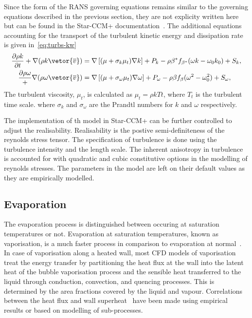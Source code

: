 Since the form of the RANS governing equations remains similar to the governing equations described in the
 previous section, they are not explicity written here but can be found in the Star-CCM+ documentation~.
 The additional equations accounting for the transport of the turbulent kinetic energy and dissipation rate 
 is given in~\ref{eq:turbs-kw}
 \begin{subequations}\label{eq:turbs-kw}
 \begin{align}
    \frac{\partial \rho k}{\partial t}  + \nabla (\rho k \vetor{\overline{v}}) &= \nabla \left[(\mu + \sigma_{k} \mu_{t})\nabla k\right] + P_k
        - \rho \beta^{*}f_{\beta^{*}} (\omega k - \omega_0 k_0) + S_k,\\
    \frac{\partial \rho \omega} + \nabla (\rho \omega \vetor{\overline{v}}) & = \nabla\left[(\mu + \sigma_{\omega}\mu_t) \nabla \omega\right] + P_{\omega}
        - \rho \beta f_{\beta}(\omega^{2} - \omega_{0}^{2}) + S_{\omega},
 \end{align} 
 \end{subequations}
 The turbulent viscosity, $\mu_t$, is calculated as $\mu_{t} = \rho k T{t}$, where $T_{t}$ is the turbulent time scale. 
 where $\sigma_{k}$ and $\sigma_{\omega}$ are the Prandtl numbers for $k$ and $\omega$ respectively. 


The implementation of th model in Star-CCM+ can be further controlled to
 adjust the realisability. Realisability is the postive semi-definiteness of the 
 reynolds stress tensor. The specification of turbulence is done using
 the turbulence intensity and the length scale. The inherent anisotropy 
 in turbulence is accounted for with quadratic and cubic constitutive options
 in the modelling of reynolds stresses. The parameters in the model
 are left on their default values as they are empirically modelled.

\subsection{Evaporation}
The evaporation process is distinguished between occuring at saturation temperatures or not. 
 Evaporation at saturation temperatures, known as vaporisation, is a much faster 
 process in comparison to evaporation at normal~\cite{wickertSimulation}. 
 In case of vaporisation along a heated wall, most CFD models of
 vaporisation treat the energy transfer by partitioning
 the heat flux at the wall into the latent heat of the bubble vaporisation process and the 
 sensible heat transferred to the liquid through conduction, convection, and quencing processes.
 This is determined by the area fractions covered by the liquid and vapour. Correlations between the
 heat flux and wall superheat~ have been made using empirical
 results or based on modelling of sub-processes.


